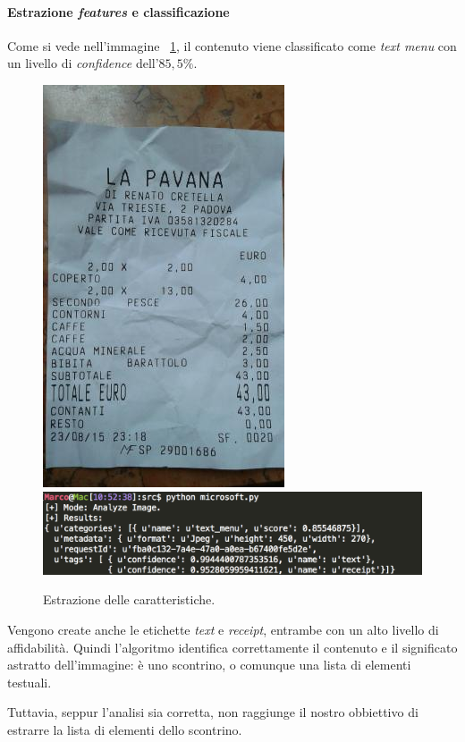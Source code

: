 \documentclass[fleqn,a4paper,11pt]{report}
\begin{document}
\paragraph{Estrazione \textit{features} e classificazione} Come si vede nell'immagine ~\ref{ms-analyze}, il contenuto viene classificato come \textit{text menu} con un livello di \textit{confidence} dell'$85,5\%$.
\begin{figure}[htbp]
\begin{center}
	\includegraphics[height=.3\textwidth]{img/scontrino.jpg}
	 \hspace*{.5in}
	\includegraphics[height=.1\textwidth]{img/ms-analyze.png}
\caption{Estrazione delle caratteristiche.}
\label{ms-analyze}
\end{center}
\end{figure}
Vengono create anche le etichette \textit{text} e \textit{receipt}, entrambe con un alto livello di affidabilità. Quindi l'algoritmo identifica correttamente il contenuto e il significato astratto dell'immagine: è uno scontrino, o comunque una lista di elementi testuali.

Tuttavia, seppur l'analisi sia corretta, non raggiunge il nostro obbiettivo di estrarre la lista di elementi dello scontrino.
\end{document}
